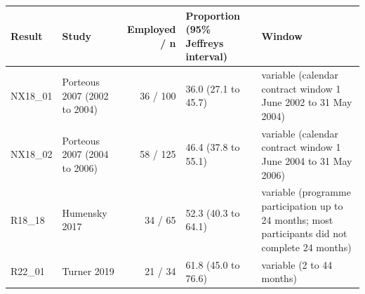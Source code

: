 
\begin{tabular}{llrlp{5.5cm}}
\toprule
Result & Study & Employed / n & Proportion (95\% Jeffreys interval) & Window\\
\midrule
NX18\_01 & Porteous 2007 (2002 to 2004) & 36 / 100 & 36.0 (27.1 to 45.7) & variable (calendar contract window 1 June 2002 to 31 May 2004)\\
NX18\_02 & Porteous 2007 (2004 to 2006) & 58 / 125 & 46.4 (37.8 to 55.1) & variable (calendar contract window 1 June 2004 to 31 May 2006)\\
R18\_18 & Humensky 2017 & 34 / 65 & 52.3 (40.3 to 64.1) & variable (programme participation up to 24 months; most participants did not complete 24 months)\\
R22\_01 & Turner 2019 & 21 / 34 & 61.8 (45.0 to 76.6) & variable (2 to 44 months)\\
\bottomrule
\end{tabular}
